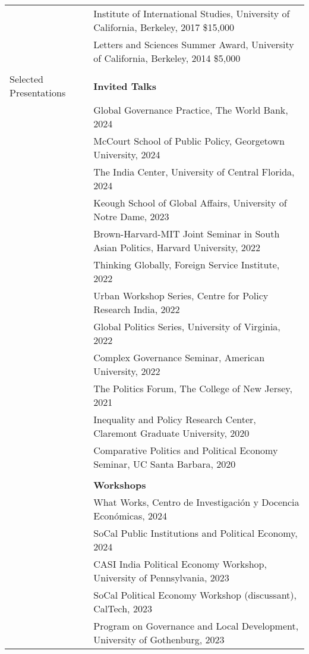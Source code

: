 \documentclass[letterpaper, 10.5pt]{article}
\begin{document}
\begin{longtable}{p{1.5in}p{5in}}
&Institute of International Studies, University of California, Berkeley, 2017 \hfill \$15,000  \\
& Letters and Sciences Summer Award, University of California, Berkeley, 2014 \hfill \$5,000\\
& \\





{{Selected Presentations}} & \textbf{Invited Talks}\\
&Global Governance Practice, The World Bank,  2024\\

&McCourt School of Public Policy, Georgetown University, 2024\\
& The India Center, University of Central Florida, 2024\\
&Keough School of Global Affairs, University of Notre Dame, 2023\\
 &Brown-Harvard-MIT Joint Seminar in South Asian Politics, Harvard University, 2022\\
  &Thinking Globally, Foreign Service Institute, 2022 \\
 &Urban Workshop Series, Centre for Policy Research India, 2022\\

 &Global Politics Series, University of Virginia, 2022\\
&Complex Governance Seminar, American University, 2022\\
&The Politics Forum, The College of New Jersey, 2021\\
 &Inequality and Policy Research Center, Claremont Graduate University, 2020\\
 & Comparative Politics and Political Economy Seminar, UC Santa Barbara, 2020\\
&\\
& \textbf{Workshops}\\ 
&What Works, Centro de Investigaci\'{o}n y Docencia Econ\'{o}micas, 2024\\


& SoCal Public Institutions and Political Economy, 2024\\ & CASI India Political Economy Workshop, University of Pennsylvania, 2023\\     

&SoCal Political Economy Workshop (discussant), CalTech, 2023\\
 &Program on Governance and Local Development, University of Gothenburg, 2023\\


\end{longtable}
\end{document}
